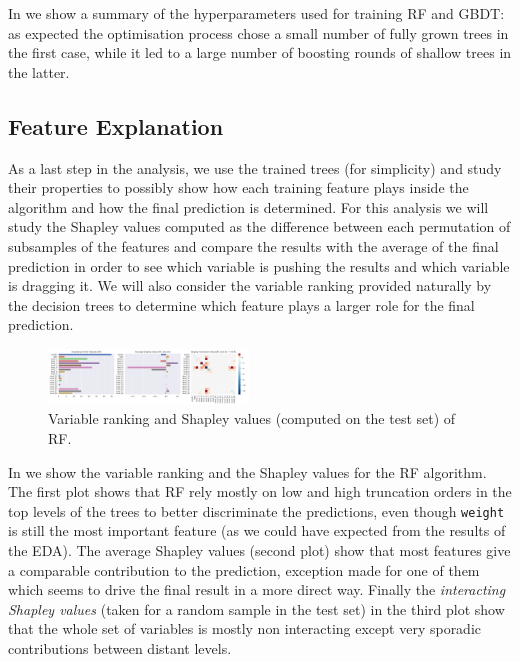 In  we show a summary of the hyperparameters used for
training RF and GBDT: as expected the optimisation process chose a small number
of fully grown trees in the first case, while it led to a large number of
boosting rounds of shallow trees in the latter.

\subsection{Feature Explanation}\label{sec:ml:shap}

As a last step in the analysis, we use the trained trees (for simplicity) and
study their properties to possibly show how each training feature plays inside
the algorithm and how the final prediction is determined.
For this analysis we will study the Shapley values computed as the difference
between each permutation of subsamples of the features and compare the results
with the average of the final prediction in order to see which variable is
pushing the results and which variable is dragging it.
We will also consider the variable ranking provided naturally by the decision trees to determine which feature plays a larger role for the final prediction.

\begin{figure}[htbp]
  \centering
  \includegraphics[width=0.475\textwidth]{img/rnd_for_shapley}
  \caption{Variable ranking and Shapley values (computed on the test set) of
  RF.}
  \label{fig:ml:rnd_for_shap}
\end{figure}

In  we show the variable ranking and the Shapley
values for the RF algorithm.
The first plot shows that RF rely mostly on low and high truncation orders in
the top levels of the trees to better discriminate the predictions, even though
\texttt{weight} is still the most important feature (as we could have expected
from the results of the EDA).
The average Shapley values (second plot) show that most features give a comparable contribution to the prediction, exception made for one of them which seems to drive the final result in a more direct way.
Finally the \textit{interacting Shapley values} (taken for a random sample in
the test set) in the third plot show that the whole set of variables is mostly
non interacting except very sporadic contributions between distant levels.

